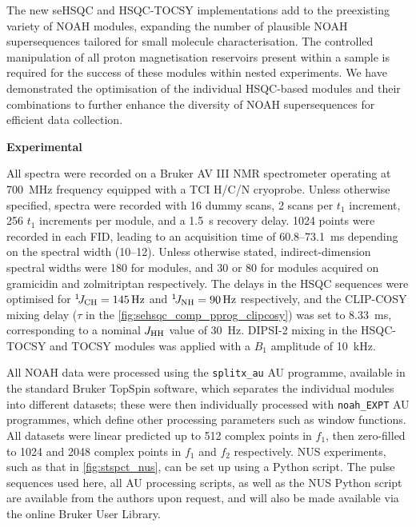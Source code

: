 \documentclass[11pt]{article}
\newcommand*{\carbon}{\ce{^{13}C}}
\newcommand*{\proton}{\ce{^{1}H}}
\newcommand*{\nitrogen}{\ce{^{15}N}}
\newcommand*{\onejch}{{}^{1}\!J_{\ce{CH}}}
\newcommand*{\onejnh}{{}^{1}\!J_{\ce{NH}}}
\newcommand*{\jhh}{J_{\ce{HH}}}
\begin{document}
\begin{refsection}

The new seHSQC and HSQC-TOCSY implementations add to the preexisting variety of NOAH modules, expanding the number of plausible NOAH supersequences tailored for small molecule characterisation.
The controlled manipulation of all proton magnetisation reservoirs present within a sample is required for the success of these modules within nested experiments.
We have demonstrated the optimisation of the individual HSQC-based modules and their combinations to further enhance the diversity of NOAH supersequences for efficient data collection.

\textbf{\Large Experimental}

All spectra were recorded on a Bruker AV III NMR spectrometer operating at \SI{700}{\MHz} \proton{} frequency equipped with a TCI H/C/N cryoprobe.
Unless otherwise specified, spectra were recorded with 16 dummy scans, 2 scans per $t_1$ increment, 256 $t_1$ increments per module, and a \SI{1.5}{\s} recovery delay.
1024 points were recorded in each FID, leading to an acquisition time of 60.8--\SI{73.1}{\ms} depending on the \proton{} spectral width (10--\SI{12}{\ppm}).
Unless otherwise stated, indirect-dimension spectral widths were \SI{180}{\ppm} for \carbon{} modules, and 30 or \SI{80}{\ppm} for \nitrogen{} modules acquired on gramicidin and zolmitriptan respectively.
The delays in the HSQC sequences were optimised for $\onejch = \SI{145}{\Hz}$ and $\onejnh = \SI{90}{\Hz}$ respectively, and the CLIP-COSY mixing delay ($\tau$ in the \cref{fig:sehsqc_comp_pprog_clipcosy}) was set to \SI{8.33}{\ms}, corresponding to a nominal $\jhh$ value of \SI{30}{Hz}.
DIPSI-2 mixing in the HSQC-TOCSY and TOCSY modules was applied with a $B_1$ amplitude of \SI{10}{\kHz}.

All NOAH data were processed using the \texttt{splitx\_au} AU programme, available in the standard Bruker TopSpin software, which separates the individual modules into different datasets; these were then individually processed with \texttt{noah\_EXPT} AU programmes, which define other processing parameters such as window functions.
All datasets were linear predicted up to 512 complex points in $f_1$, then zero-filled to 1024 and 2048 complex points in $f_1$ and $f_2$ respectively.
NUS experiments, such as that in \cref{fig:stspct_nus}, can be set up using a Python script.
The pulse sequences used here, all AU processing scripts, as well as the NUS Python script are available from the authors upon request, and will also be made available via the online Bruker User Library.


\end{refsection}
\end{document}
